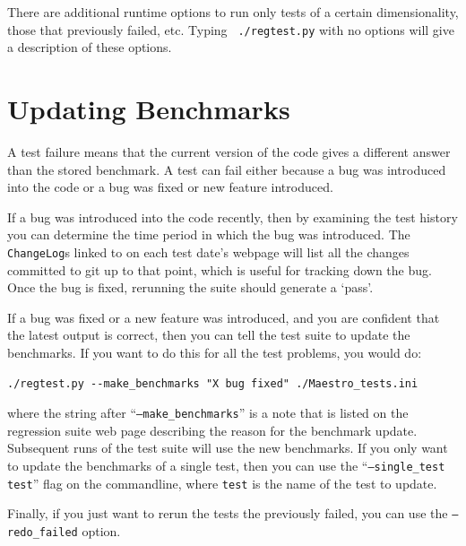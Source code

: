 There are additional runtime options to run only tests of a certain
dimensionality, those that previously failed, etc.  Typing {\tt
  ./regtest.py} with no options will give a description of these
options.


\section{Updating Benchmarks}

A test failure means that the current version of the code gives a
different answer than the stored benchmark.  A test can fail either
because a bug was introduced into the code or a bug was fixed or new
feature introduced.

If a bug was introduced into the code recently, then by examining the
test history you can determine the time period in which the bug was
introduced.  The {\tt ChangeLog}s linked to on each test date's webpage
will list all the changes committed to git up to that point, which is
useful for tracking down the bug.  Once the bug is fixed, rerunning
the suite should generate a `pass'.

If a bug was fixed or a new feature was introduced, and you are
confident that the latest output is correct, then you can tell the
test suite to update the benchmarks.  If you want to do this for all
the test problems, you would do:
\begin{verbatim}
./regtest.py --make_benchmarks "X bug fixed" ./Maestro_tests.ini
\end{verbatim}
where the string after ``{\tt --make\_benchmarks}'' is a note that is listed
on the regression suite web page describing the reason for the benchmark
update.  Subsequent runs of the test suite will use the new benchmarks.
If you only want to update the benchmarks of a single test, then you
can use the ``{\tt --single\_test test}'' flag on the commandline, where
{\tt test} is the name of the test to update.  

Finally, if you just want to rerun the tests the previously failed,
you can use the {\tt --redo\_failed} option.


